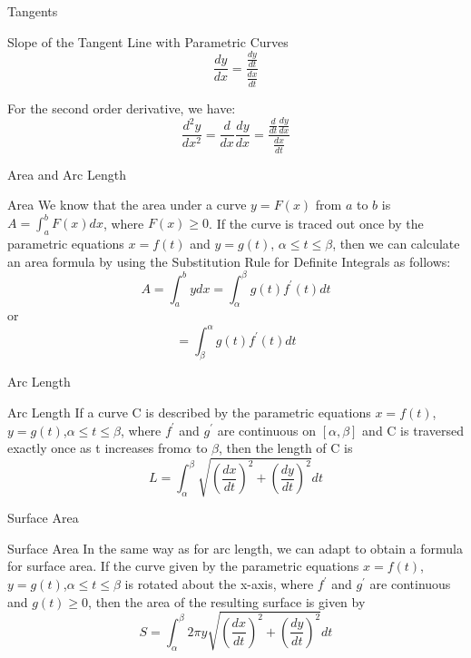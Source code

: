 \documentclass{beamer}
\begin{document}
\begin{frame}{Tangents}
    \begin{block}{Slope of the Tangent Line with Parametric Curves}
    $$\frac{dy}{dx}=\frac{\frac{dy}{dt}}{\frac{dx}{dt}}$$
    \end{block}
For the second order derivative, we have:\\
$$\frac{d^2y}{dx^2}=\frac{d}{dx}\frac{dy}{dx}=\frac{\frac{d}{dt}\frac{dy}{dx}}{\frac{dx}{dt}}$$
\end{frame}

\begin{frame}{Area and Arc Length}
    \begin{block}{Area}
We know that the area under a curve $y = F(x)$ from $a$ to $b$ is
$A = \int_a ^b F(x) dx$, where $F(x) \geqslant 0$. If the curve is traced out once by the parametric equations $x = f(t)$ and $y = g(t)$, $\alpha \leqslant t \leqslant \beta$, then we can calculate an area formula by using the Substitution Rule for Definite Integrals as follows:
$$A=\int _a^b y dx = \int_{\alpha}^{\beta} g(t) f^{\prime}(t) dt$$ or $$=\int^{\alpha}_{\beta} g(t) f^{\prime}(t) dt$$
    \end{block}
\end{frame}

\begin{frame}{Arc Length}
    \begin{block}{Arc Length}
    If a curve C is described by the parametric equations $x = f(t)$,$y = g(t)$,$\alpha \leqslant t \leqslant \beta $, where $f^{\prime}$ and $g^{\prime}$ are continuous on $[\alpha,\beta]$ and C is traversed exactly once as t increases from$\alpha$ to $\beta$, then the length of C is
    $$L=\int_{\alpha}^{\beta}\sqrt{(\frac{dx}{dt})^2+(\frac{dy}{dt})^2} dt $$
    \end{block}
\end{frame}

\begin{frame}{Surface Area}
    \begin{block}{Surface Area}
        In the same way as for arc length, we can adapt to obtain a formula for
surface area. If the curve given by the parametric equations $x = f(t)$,$y = g(t)$,$\alpha \leqslant t \leqslant \beta $ is rotated about the x-axis, where $f^{\prime}$ and $g^{\prime}$ are continuous and $g(t) \geqslant 0$, then the area of the resulting surface is given by
$$ S=\int_{\alpha}^{\beta} 2\pi y\sqrt{(\frac{dx}{dt})^2+(\frac{dy}{dt})^2} dt $$
    \end{block}
    
\end{frame}
\end{document}
